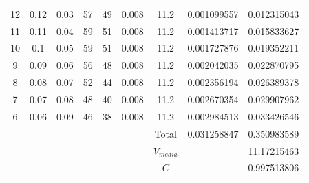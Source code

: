 \documentclass[11pt,letterpaper]{extarticle}        %
\numberwithin{equation}{section}                    %
\begin{document}
\begin{table}[H]
{\begin{tabular}{|ccccccccc|}
12                 & 0.12              & 0.03         & 57    & 49       & 0.008             & 11.2               & 0.001099557 & 0.012315043 \\
11                 & 0.11              & 0.04         & 59    & 51       & 0.008             & 11.2               & 0.001413717 & 0.015833627 \\
10                 & 0.1               & 0.05         & 59    & 51       & 0.008             & 11.2               & 0.001727876 & 0.019352211 \\
9                  & 0.09              & 0.06         & 56    & 48       & 0.008             & 11.2               & 0.002042035 & 0.022870795 \\
8                  & 0.08              & 0.07         & 52    & 44       & 0.008             & 11.2               & 0.002356194 & 0.026389378 \\
7                  & 0.07              & 0.08         & 48    & 40       & 0.008             & 11.2               & 0.002670354 & 0.029907962 \\
6                  & 0.06              & 0.09         & 46    & 38       & 0.008             & 11.2               & 0.002984513 & 0.033426546 \\ \hline
                   &                   &              &       &          &                   & Total              & 0.031258847 & 0.350983589 \\
                   &                   &              &       &          &                   & $V_{media}$                &      & 11.17215463 \\
                   &                   &              &       &          &                   &    $C$                &          & 0.997513806\\ \hline
\end{tabular}
}
\end{table}
\end{document}
